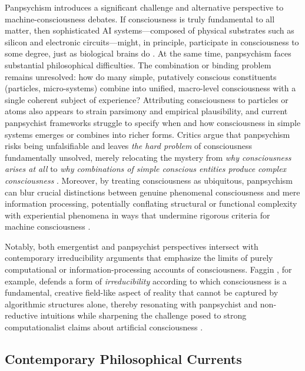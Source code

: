 Panpsychism introduces a significant challenge and alternative perspective to machine-consciousness debates. If consciousness is truly fundamental to all matter, then sophisticated AI systems---composed of physical substrates such as silicon and electronic circuits---might, in principle, participate in consciousness to some degree, just as biological brains do \cite{butlin2023consciousness,reggia2013rise}. At the same time, panpsychism faces substantial philosophical difficulties. The combination or binding problem remains unresolved: how do many simple, putatively conscious constituents (particles, micro-systems) combine into unified, macro-level consciousness with a single coherent subject of experience? Attributing consciousness to particles or atoms also appears to strain parsimony and empirical plausibility, and current panpsychist frameworks struggle to specify when and how consciousness in simple systems emerges or combines into richer forms. Critics argue that panpsychism risks being unfalsifiable and leaves \emph{the hard problem} of consciousness fundamentally unsolved, merely relocating the mystery from \emph{why consciousness arises at all} to \emph{why combinations of simple conscious entities produce complex consciousness} \cite{chalmers2016combination,francken2022consciousness}. Moreover, by treating consciousness as ubiquitous, panpsychism can blur crucial distinctions between genuine phenomenal consciousness and mere information processing, potentially conflating structural or functional complexity with experiential phenomena in ways that undermine rigorous criteria for machine consciousness \cite{garridomerchan2024machine,reggia2013rise}.

Notably, both emergentist and panpsychist perspectives intersect with contemporary irreducibility arguments that emphasize the limits of purely computational or information-processing accounts of consciousness. Faggin \citeyear{faggin2024irreducible}, for example, defends a form of \emph{irreducibility} according to which consciousness is a fundamental, creative field-like aspect of reality that cannot be captured by algorithmic structures alone, thereby resonating with panpsychist and non-reductive intuitions while sharpening the challenge posed to strong computationalist claims about artificial consciousness \cite{faggin2024irreducible,penrose1990emperors}.

\subsection{Contemporary Philosophical Currents}

